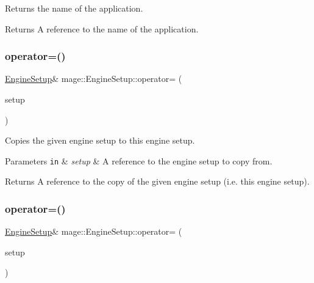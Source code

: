 Returns the name of the application.

\begin{DoxyReturn}{Returns}
A reference to the name of the application. 
\end{DoxyReturn}
\hypertarget{structmage_1_1_engine_setup_ad7066882519b59ca533293f743334508}{}\label{structmage_1_1_engine_setup_ad7066882519b59ca533293f743334508} 
\subsubsection{\texorpdfstring{operator=()}{operator=()}\hspace{0.1cm}{\footnotesize\ttfamily [1/2]}}
{\footnotesize\ttfamily \hyperlink{structmage_1_1_engine_setup}{Engine\+Setup}\& mage\+::\+Engine\+Setup\+::operator= (\begin{DoxyParamCaption}\item[{const \hyperlink{structmage_1_1_engine_setup}{Engine\+Setup} \&}]{setup }\end{DoxyParamCaption})\hspace{0.3cm}{\ttfamily [delete]}}

Copies the given engine setup to this engine setup.


\begin{DoxyParams}[1]{Parameters}
\mbox{\tt in}  & {\em setup} & A reference to the engine setup to copy from. \\
\hline
\end{DoxyParams}
\begin{DoxyReturn}{Returns}
A reference to the copy of the given engine setup (i.\+e. this engine setup). 
\end{DoxyReturn}
\hypertarget{structmage_1_1_engine_setup_a9ca25ff88af30786022964916790a497}{}\label{structmage_1_1_engine_setup_a9ca25ff88af30786022964916790a497} 
\subsubsection{\texorpdfstring{operator=()}{operator=()}\hspace{0.1cm}{\footnotesize\ttfamily [2/2]}}
{\footnotesize\ttfamily \hyperlink{structmage_1_1_engine_setup}{Engine\+Setup}\& mage\+::\+Engine\+Setup\+::operator= (\begin{DoxyParamCaption}\item[{\hyperlink{structmage_1_1_engine_setup}{Engine\+Setup} \&\&}]{setup }\end{DoxyParamCaption})\hspace{0.3cm}{\ttfamily [delete]}}

